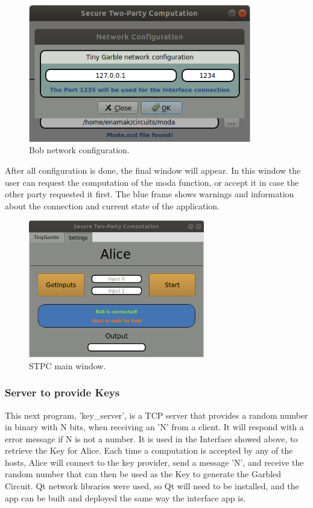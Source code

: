 \begin{refsection}
\begin{figure}[H]
	\centering
	\includegraphics[width=.8\textwidth, height=6cm]{./sdf/tiny_garble/figures/STPC_bob.png}
    \caption{Bob network configuration.}\label{fig:STPC_bob}
\end{figure}

After all configuration is done, the final window will appear. In this window the user can request the computation of the moda function, or accept it in case the other party requested it first.
The blue frame shows warnings and information about the connection and current state of the application.

\begin{figure}[H]
	\centering
	\includegraphics[width=.8\textwidth, height=6cm]{./sdf/tiny_garble/figures/STPC_a.png}
    \caption{STPC main window.}\label{fig:STPC_a}
\end{figure}

\subsubsection{Server to provide Keys}

This next program, 'key\_server', is a TCP server that provides a random number in binary with N bits, when receiving an 'N' from a client. It will respond with a error message if N is not a number.
It is used in the Interface showed above, to retrieve the Key for Alice. Each time a computation is accepted by any of the hosts, Alice will connect to the key provider, send a message 'N', and receive the random number that can then be used as the Key to generate the Garbled Circuit.
Qt network libraries were used, so Qt will need to be installed, and the app can be built and deployed the same way the interface app is.


\end{refsection}

